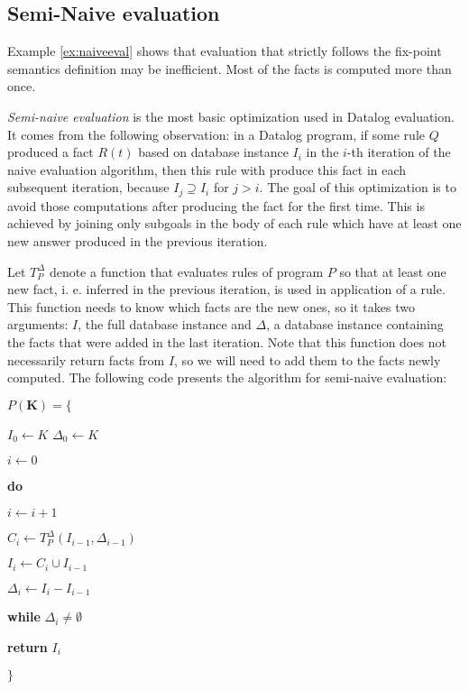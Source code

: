 \documentclass{pracamgr}
\theoremstyle{plain}
\theoremstyle{definition}
\theoremstyle{remark}
\begin{document}
\subsection{Semi-Naive evaluation}
Example \ref{ex:naiveeval} shows that evaluation that strictly follows the fix-point semantics definition may be inefficient. Most of the facts is computed more than once.

\emph{Semi-naive evaluation} is the most basic optimization used in Datalog evaluation. It comes from the following observation: in a Datalog program, if some rule $Q$ produced a fact $R(t)$ based on database instance $I_i$ in the $i$-th iteration of the naive evaluation algorithm, then this rule with produce this fact in each subsequent iteration, because $I_j \supseteq I_i$ for $j > i$. The goal of this optimization is to avoid those computations after producing the fact for the first time. This is achieved by joining only subgoals in the body of each rule which have at least one new answer produced in the previous iteration.

Let $T^\Delta_P$ denote a function that evaluates rules of program $P$ so that at least one new fact, i. e. inferred in the previous iteration, is used in application of a rule. This function needs to know which facts are the new ones, so it takes two arguments: $I$, the full database instance and $\Delta$, a database instance containing the facts that were added in the last iteration. Note that this function does not necessarily return facts from $I$, so we will need to add them to the facts newly computed. The following code presents the algorithm for semi-naive evaluation: 


\parbox{0.5\textwidth}{
$P(\textbf{K}) = \{$

{\addtolength{\leftskip}{5mm}

$I_0 \leftarrow K$
$\Delta_0 \leftarrow K$

$i \leftarrow 0$

\textbf{do}

{\addtolength{\leftskip}{5mm}

$i \leftarrow i + 1$

$C_i \leftarrow T_P^\Delta(I_{i-1}, \Delta_{i-1})$

$I_i \leftarrow C_i \cup I_{i-1}$

$\Delta_i \leftarrow I_i - I_{i-1}$

}

\textbf{while} $\Delta_i \ne \emptyset$

\textbf{return} $I_i$

}

$\}$
}
\end{document}
